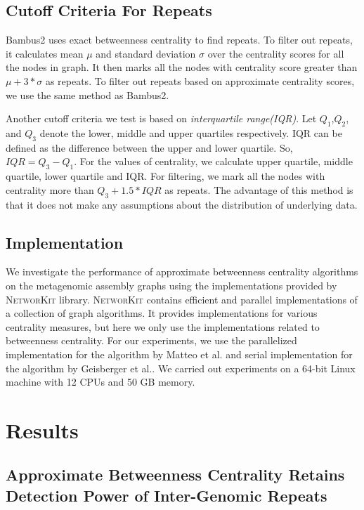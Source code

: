 \documentclass[runningheads,a4paper]{llncs}
\begin{document}
\subsection*{Cutoff Criteria For Repeats}
Bambus2\cite{bambus} uses exact betweenness centrality to find repeats. To filter out repeats, it calculates mean $\mu$ and standard deviation $\sigma$ over the centrality scores for all the nodes in graph. It then marks all the nodes with centrality score greater than $\mu + 3*\sigma$ as repeats. To filter out repeats based on approximate centrality scores, we use the same method as Bambus2. 

Another cutoff criteria we test is based on \textit{interquartile range(IQR)}. Let $Q_{1}$,$Q_{2}$, and $Q_{3}$ denote the lower, middle and upper quartiles respectively. IQR can be defined as the difference between the upper and lower quartile. So, $IQR = Q_{3} - Q_{1}$. For the values of centrality, we calculate upper quartile, middle quartile, lower quartile and IQR. For filtering, we mark all the nodes with centrality more than $Q_{3} + 1.5*IQR$ as repeats. The advantage of this method is that it does not make any assumptions about the distribution of underlying data. 

\subsection*{Implementation}
We investigate the performance of approximate betweenness centrality algorithms on the metagenomic assembly graphs using the implementations provided by \textsc{NetworKit}\cite{networkit} library. \textsc{NetworKit} contains efficient and parallel implementations of a collection of graph algorithms.
It provides implementations for various centrality measures, but here we only use the implementations related to betweenness centrality. For our experiments, we use the parallelized implementation for the algorithm by Matteo et al.\cite{matteo} and serial implementation for the algorithm by Geisberger et al.\cite{sanders}.
We carried out experiments on a 64-bit Linux machine with 12 CPUs and 50 GB memory. 

\section{Results} 


\subsection*{Approximate Betweenness Centrality Retains Detection Power of Inter-Genomic Repeats}
\end{document}
